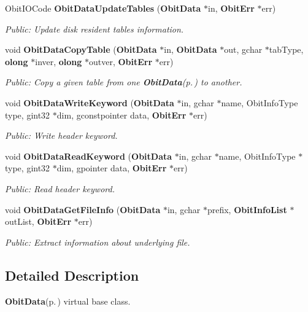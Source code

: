 \begin{CompactItemize}
Obit\-IOCode {\bf Obit\-Data\-Update\-Tables} ({\bf Obit\-Data} $\ast$in, {\bf Obit\-Err} $\ast$err)
\begin{CompactList}\small\item\em Public: Update disk resident tables information. \item\end{CompactList}\item 
void {\bf Obit\-Data\-Copy\-Table} ({\bf Obit\-Data} $\ast$in, {\bf Obit\-Data} $\ast$out, gchar $\ast$tab\-Type, {\bf olong} $\ast$inver, {\bf olong} $\ast$outver, {\bf Obit\-Err} $\ast$err)
\begin{CompactList}\small\item\em Public: Copy a given table from one {\bf Obit\-Data}{\rm (p.\,\pageref{structObitData})} to another. \item\end{CompactList}\item 
void {\bf Obit\-Data\-Write\-Keyword} ({\bf Obit\-Data} $\ast$in, gchar $\ast$name, Obit\-Info\-Type type, gint32 $\ast$dim, gconstpointer data, {\bf Obit\-Err} $\ast$err)
\begin{CompactList}\small\item\em Public: Write header keyword. \item\end{CompactList}\item 
void {\bf Obit\-Data\-Read\-Keyword} ({\bf Obit\-Data} $\ast$in, gchar $\ast$name, Obit\-Info\-Type $\ast$type, gint32 $\ast$dim, gpointer data, {\bf Obit\-Err} $\ast$err)
\begin{CompactList}\small\item\em Public: Read header keyword. \item\end{CompactList}\item 
void {\bf Obit\-Data\-Get\-File\-Info} ({\bf Obit\-Data} $\ast$in, gchar $\ast$prefix, {\bf Obit\-Info\-List} $\ast$out\-List, {\bf Obit\-Err} $\ast$err)
\begin{CompactList}\small\item\em Public: Extract information about underlying file. \item\end{CompactList}\end{CompactItemize}


\subsection{Detailed Description}
{\bf Obit\-Data}{\rm (p.\,\pageref{structObitData})} virtual base class. 

